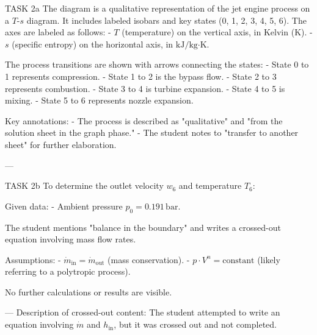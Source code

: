 TASK 2a  
The diagram is a qualitative representation of the jet engine process on a \( T \)-\( s \) diagram. It includes labeled isobars and key states (0, 1, 2, 3, 4, 5, 6). The axes are labeled as follows:  
- \( T \) (temperature) on the vertical axis, in Kelvin (\( \text{K} \)).  
- \( s \) (specific entropy) on the horizontal axis, in \( \text{kJ}/\text{kg·K} \).  

The process transitions are shown with arrows connecting the states:  
- State 0 to 1 represents compression.  
- State 1 to 2 is the bypass flow.  
- State 2 to 3 represents combustion.  
- State 3 to 4 is turbine expansion.  
- State 4 to 5 is mixing.  
- State 5 to 6 represents nozzle expansion.  

Key annotations:  
- The process is described as "qualitative" and "from the solution sheet in the graph phase."  
- The student notes to "transfer to another sheet" for further elaboration.  

---

TASK 2b  
To determine the outlet velocity \( w_6 \) and temperature \( T_6 \):  

Given data:  
- Ambient pressure \( p_0 = 0.191 \, \text{bar} \).  

The student mentions "balance in the boundary" and writes a crossed-out equation involving mass flow rates.  

Assumptions:  
- \( \dot{m}_{\text{in}} = \dot{m}_{\text{out}} \) (mass conservation).  
- \( p \cdot V^n = \text{constant} \) (likely referring to a polytropic process).  

No further calculations or results are visible.  

---  
Description of crossed-out content:  
The student attempted to write an equation involving \( \dot{m} \) and \( h_{\text{in}} \), but it was crossed out and not completed.  

